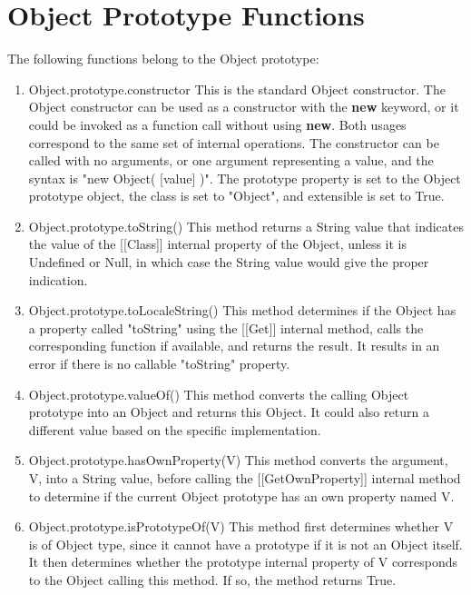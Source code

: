 \documentclass[a4paper,11pt,twoside]{report}
\begin{document}
\section{Object Prototype Functions}
The following functions belong to the Object prototype: 
\begin{enumerate}
\item Object.prototype.constructor \newline
This is the standard Object constructor. The Object constructor can be used as a constructor with the \textbf{new} keyword, or it could be invoked as a function call without using \textbf{new}. Both usages correspond to the same set of internal operations. The constructor can be called with no arguments, or one argument representing a value, and the syntax is "new Object( [value] )".
The prototype property is set to the Object prototype object, the class is set to "Object", and extensible is set to True.

\item Object.prototype.toString() \newline
This method returns a String value that indicates the value of the [[Class]] internal property of the Object, unless it is Undefined or Null, in which case the String value would give the proper indication.

\item Object.prototype.toLocaleString() \newline
This method determines if the Object has a property called "toString" using the [[Get]] internal method, calls the corresponding function if available, and returns the result. It results in an error if there is no callable "toString" property.

\item Object.prototype.valueOf() \newline
This method converts the calling Object prototype into an Object and returns this Object. It could also return a different value based on the specific implementation.

\item Object.prototype.hasOwnProperty(V) \newline
This method converts the argument, V, into a String value, before calling the [[GetOwnProperty]] internal method to determine if the current Object prototype has an own property named V.

\item Object.prototype.isPrototypeOf(V) \newline
This method first determines whether V is of Object type, since it cannot have a prototype if it is not an Object itself. It then determines whether the prototype internal property of V corresponds to the Object calling this method. If so, the method returns True.


\end{enumerate}
\end{document}
